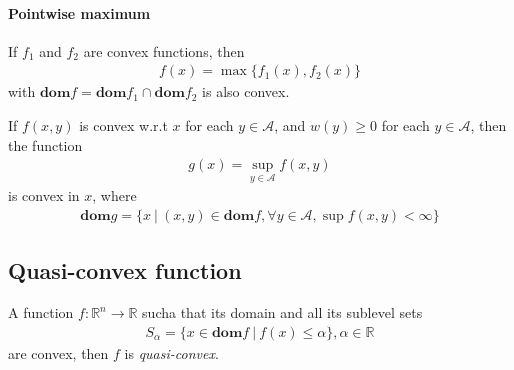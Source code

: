 \paragraph{Pointwise maximum}
If $f_1$ and $f_2$ are convex functions, then
\begin{align}
    f(x) = \max \{ f_1(x), f_2(x) \}
\end{align}
with $\mathbf{dom}f = \mathbf{dom}f_1 \cap \mathbf{dom}f_2$
is also convex.
\par
If $f(x, y)$ is convex w.r.t $x$ for each
$y \in \mathcal{A}$, and $w(y) \geq 0$ for each
$y \in \mathcal{A}$, then the function
\begin{align}
    g(x) = \sup_{y \in \mathcal{A}}f(x, y)
\end{align}
is convex in $x$, where
\begin{align}
    \mathbf{dom}g = \{ x \ | \ (x, y) \in \mathbf{dom}f,
    \forall y \in \mathcal{A}, \sup f(x, y) < \infty \}
\end{align}

\subsection{Quasi-convex function}
\begin{definition}
    A function $f: \mathbb{R}^n \rightarrow \mathbb{R}$
    sucha that its domain and all its sublevel sets
    \begin{align}
        S_\alpha = \{ x \in \mathbf{dom}f \ | \
        f(x) \leq \alpha \}, \alpha \in \mathbb{R}
    \end{align}
    are convex,
    then $f$ is \emph{quasi-convex}.
\end{definition}


